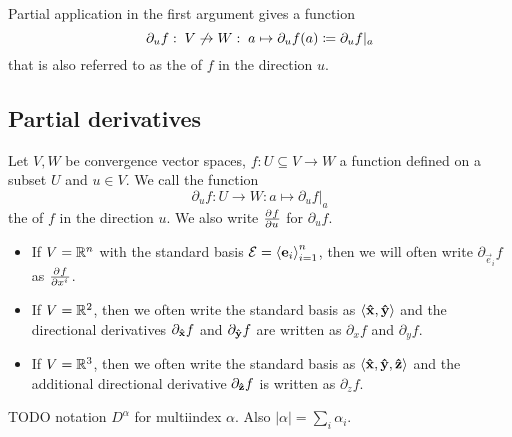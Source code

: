 Partial application in the first argument gives a function
\[ \partial_u f:\; V\not\to W:\; a\mapsto \partial_u f(a) \coloneqq \partial_u f|_a \]
that is also referred to as the  of $f$ in the direction $u$.



\subsection{Partial derivatives}
\begin{definition}
Let $V,W$ be convergence vector spaces, $f:U\subseteq V\to W$ a function defined on a subset $U$ and $u\in V$.
We call the function
\[ \partial_u f: U\to W: a\mapsto \partial_u f|_a \]
the  of $f$ in the direction $u$. We also write $ \frac{\partial{^{}}f}{\partial{{u}^{}}} $ for $\partial_u f$.
\begin{itemize}
\item If $V = \mathbb{R}^n$ with the standard basis $\mathcal{E} = \left\langle \boldsymbol{\mathrm{e}}_i \right\rangle_{i=1}^n$, then we will often write $\partial_{\vec{e}_i}f$ as $ \frac{\partial{^{}}f}{\partial{{x^i}^{}}} $.
\item If $V = \mathbb{R}^2$, then we often write the standard basis as $\left\langle \boldsymbol{\mathrm{\hat{x}}}, \boldsymbol{\mathrm{\hat{y}}} \right\rangle$ and the directional derivatives $\partial_{\boldsymbol{\mathrm{\hat{x}}}}f$ and $\partial_{\boldsymbol{\mathrm{\hat{y}}}}f$ are written as $\partial_{x}f$ and $\partial_{y}f$.
\item If $V = \mathbb{R}^3$, then we often write the standard basis as $\left\langle \boldsymbol{\mathrm{\hat{x}}}, \boldsymbol{\mathrm{\hat{y}}}, \boldsymbol{\mathrm{\hat{z}}} \right\rangle$ and the additional directional derivative $\partial_{\boldsymbol{\mathrm{\hat{z}}}}f$ is written as $\partial_{z}f$.
\end{itemize}
\end{definition}
TODO notation $D^\alpha$ for multiindex $\alpha$. Also $|\alpha| = \sum_i \alpha_i$.


